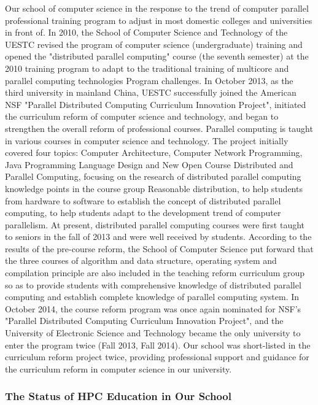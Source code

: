 \documentclass{mcmthesis}
\begin{document}
\par Our school of computer science in the response to the trend of computer parallel professional training program to adjust in most domestic colleges and universities in front of. In 2010, the School of Computer Science and Technology of the UESTC revised the program of computer science (undergraduate) training and opened the "distributed parallel computing" course (the seventh semester) at the 2010 training program to adapt to the traditional training of multicore and parallel computing technologies Program challenges. In October 2013, as the third university in mainland China, UESTC successfully joined the American NSF "Parallel Distributed Computing Curriculum Innovation Project", initiated the curriculum reform of computer science and technology, and began to strengthen the overall reform of professional courses. Parallel computing is taught in various courses in computer science and technology. The project initially covered four topics: Computer Architecture, Computer Network Programming, Java Programming Language Design and New Open Course Distributed and Parallel Computing, focusing on the research of distributed parallel computing knowledge points in the course group Reasonable distribution, to help students from hardware to software to establish the concept of distributed parallel computing, to help students adapt to the development trend of computer parallelism. At present, distributed parallel computing courses were first taught to seniors in the fall of 2013 and were well received by students. According to the results of the pre-course reform, the School of Computer Science put forward that the three courses of algorithm and data structure, operating system and compilation principle are also included in the teaching reform curriculum group so as to provide students with comprehensive knowledge of distributed parallel computing and establish complete knowledge of parallel computing system. In October 2014, the course reform program was once again nominated for NSF's "Parallel Distributed Computing Curriculum Innovation Project", and the University of Electronic Science and Technology became the only university to enter the program twice (Fall 2013, Fall 2014). Our school was short-listed in the curriculum reform project twice, providing professional support and guidance for the curriculum reform in computer science in our university.

\subsubsection{The Status of HPC Education in Our School}
\end{document}
